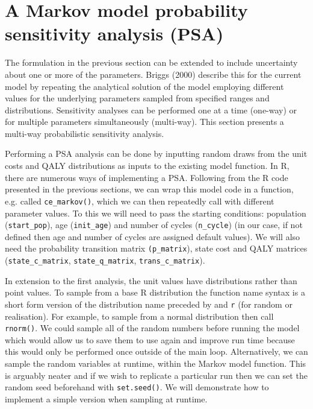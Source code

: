 %
\chapter{A Markov model probability sensitivity analysis (PSA)}
The formulation in the previous section can be extended to include uncertainty about one or more of the parameters. Briggs (2000) describe this for the current model by repeating the analytical solution of the model employing different values for the underlying parameters sampled from specified ranges and distributions. Sensitivity analyses can be performed one at a time (one-way) or for multiple parameters simultaneously (multi-way). This section presents a multi-way probabilistic sensitivity analysis. 

Performing a PSA analysis can be done by inputting random draws from the unit costs and QALY distributions as inputs to the existing model function. In R, there are numerous ways of implementing a PSA. Following from the R code presented in the previous sections, we can wrap this model code in a function, e.g. called \texttt{ce\_markov()}, which we can then repeatedly call with different parameter values. To this we will need to pass the starting conditions: population (\texttt{start\_pop}), age (\texttt{init\_age}) and number of cycles (\texttt{n\_cycle}) (in our case, if not defined then age and number of cycles are assigned default values). We will also need the probability transition matrix \texttt{(p\_matrix}), state cost and QALY matrices (\texttt{state\_c\_matrix}, \texttt{state\_q\_matrix}, \texttt{trans\_c\_matrix}).

In extension to the first analysis, the unit values have distributions rather than point values. To sample from a base R distribution the function name syntax is a short form version of the distribution name preceded by and \texttt{r} (for random or realisation). For example, to sample from a normal distribution then call \texttt{rnorm()}. We could sample all of the random numbers before running the model which would allow us to save them to use again and improve run time because this would only be performed once outside of the main loop. Alternatively, we can sample the random variables at runtime, within the Markov model function. This is arguably neater and if we wish to replicate a particular run then we can set the random seed beforehand with \texttt{set.seed()}. We will demonstrate how to implement a simple version when sampling at runtime.


